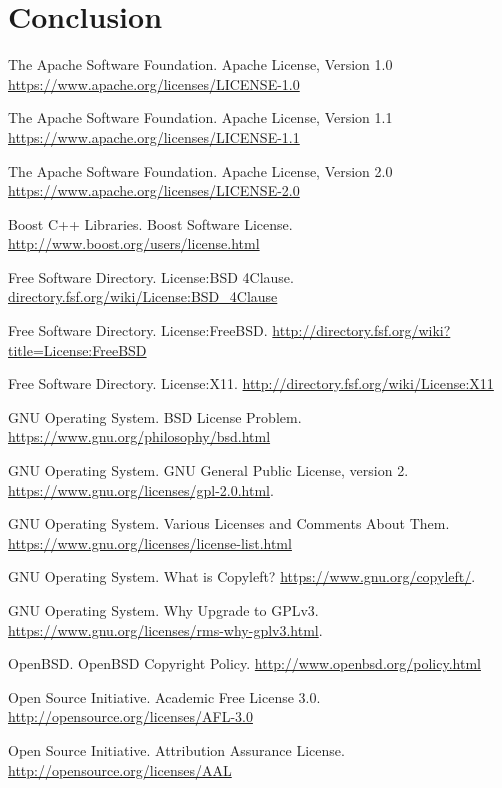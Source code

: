 \documentclass[12pt,letterpaper]{article}
\begin{document}
\section{Conclusion}

\newpage

\begin{thebibliography}{20}

 The Apache Software Foundation. Apache License, Version 1.0 \url{https://www.apache.org/licenses/LICENSE-1.0}

 The Apache Software Foundation. Apache License, Version 1.1 \url{https://www.apache.org/licenses/LICENSE-1.1}

 The Apache Software Foundation. Apache License, Version 2.0 \url{https://www.apache.org/licenses/LICENSE-2.0}

 Boost C++ Libraries. Boost Software License. \url{http://www.boost.org/users/license.html}

 Free Software Directory. License:BSD 4Clause. \url{directory.fsf.org/wiki/License:BSD_4Clause}

 Free Software Directory. License:FreeBSD. \url{http://directory.fsf.org/wiki?title=License:FreeBSD}

 Free Software Directory. License:X11. \url{http://directory.fsf.org/wiki/License:X11}

 GNU Operating System. BSD License Problem. \url{https://www.gnu.org/philosophy/bsd.html}

 GNU Operating System. GNU General Public License, version 2. \url{https://www.gnu.org/licenses/gpl-2.0.html}.

 GNU Operating System. Various Licenses and Comments About Them. \url{https://www.gnu.org/licenses/license-list.html}

 GNU Operating System. What is Copyleft? \url{https://www.gnu.org/copyleft/}.

 GNU Operating System. Why Upgrade to GPLv3. \url{https://www.gnu.org/licenses/rms-why-gplv3.html}.

 OpenBSD. OpenBSD Copyright Policy. \url{http://www.openbsd.org/policy.html}

 Open Source Initiative. Academic Free License 3.0. \url{http://opensource.org/licenses/AFL-3.0}

 Open Source Initiative. Attribution Assurance License. \url{http://opensource.org/licenses/AAL}


\end{thebibliography}
\end{document}
